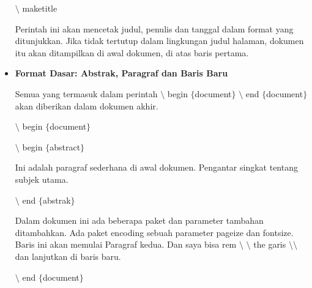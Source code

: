 \begin{itemize}
\hspace*{0.5in}$\setminus$ maketitle\par

\hspace*{0.5in}Perintah ini akan mencetak judul, penulis dan tanggal dalam format yang ditunjukkan. Jika \hspace*{0.5in}tidak tertutup dalam lingkungan judul halaman, dokumen itu akan ditampilkan di awal \hspace*{0.5in}dokumen, di atas baris pertama.\hspace*{0.5in}\par

\vspace{10pt}
	\item {\fontsize{14pt}{14pt}\selectfont \textbf{Format Dasar: Abstrak, Paragraf dan Baris Baru}}\par

Semua yang termasuk dalam perintah $\setminus$ begin $ \{ $document$ \} $ $\setminus$ end $ \{ $document$ \} $ akan diberikan dalam dokumen akhir.\par

\hspace*{0.5in}$\setminus$ begin $ \{ $document$ \} $\par

\hspace*{0.5in}$\setminus$ begin $ \{ $abstract$ \} $\par

\hspace*{0.5in}Ini adalah paragraf sederhana di awal dokumen. Pengantar singkat tentang subjek utama.\par

\hspace*{0.5in}$\setminus$ end $ \{ $abstrak$ \} $\par

\hspace*{0.5in}Dalam dokumen ini ada beberapa paket dan parameter tambahan ditambahkan. Ada paket \hspace*{0.5in}encoding sebuah parameter pageize dan fontsize. Baris ini akan memulai Paragraf kedua. \hspace*{0.5in}Dan saya bisa rem $\setminus$ $\setminus$ the garis $\setminus$$\setminus$ dan lanjutkan di baris baru.\par

\hspace*{0.5in}$\setminus$ end $ \{ $document$ \} $\par


\end{itemize}
